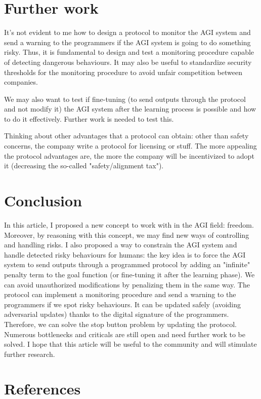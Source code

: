 \documentclass{article}
\begin{document}
\section{Further work}
It's not evident to me how to design a protocol to monitor the AGI system and send a warning to the programmers if the AGI system is going to do something risky. Thus, it is fundamental to design and test a monitoring procedure capable of detecting dangerous behaviours.
It may also be useful to standardize security thresholds for the monitoring procedure to avoid unfair competition between companies.

We may also want to test if fine-tuning (to send outputs through the protocol and not modify it) the AGI system after the learning process is possible and how to do it effectively. Further work is needed to test this.

Thinking about other advantages that a protocol can obtain: other than safety concerns, the company write a protocol for licensing or stuff. 
The more appealing the protocol advantages are, the more the company will be incentivized to adopt it (decreasing the so-called "safety/alignment tax").

\section{Conclusion}
In this article, I proposed a new concept to work with in the AGI field: freedom. Moreover, by reasoning with this concept, we may find new ways of controlling and handling risks.
I also proposed a way to constrain the AGI system and handle detected risky behaviours for humans: the key idea is to force the AGI system to send outputs through a programmed protocol by adding an "infinite" penalty term to the goal function (or fine-tuning it after the learning phase). 
We can avoid unauthorized modifications by penalizing them in the same way.
The protocol can implement a monitoring procedure and send a warning to the programmers if we spot risky behaviours.
It can be updated safely (avoiding adversarial updates) thanks to the digital signature of the programmers. 
Therefore, we can solve the stop button problem by updating the protocol.
Numerous bottlenecks and criticals are still open and need further work to be solved.
I hope that this article will be useful to the community and will stimulate further research.

\newpage
\section*{References}
    \printbibliography[heading=none]
\end{document}
